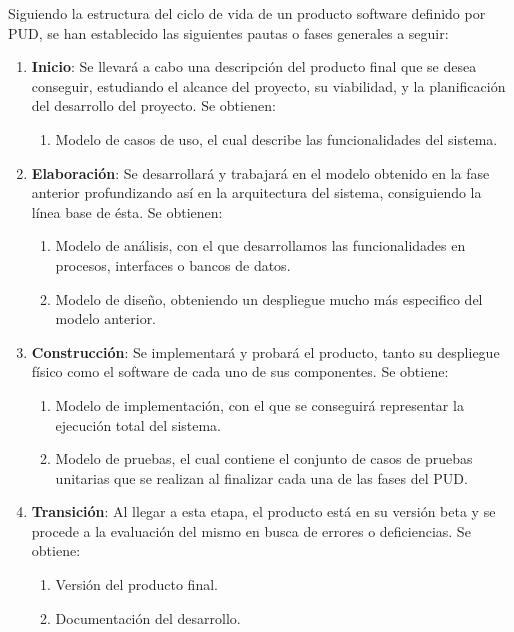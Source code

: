 Siguiendo la estructura del ciclo de vida de un producto software definido por PUD, se han establecido las siguientes pautas o fases generales a seguir:

\begin{enumerate}
    \item \textbf{Inicio}: Se llevará a cabo una descripción del producto final que se desea conseguir, estudiando el alcance del proyecto, su viabilidad, y la planificación del desarrollo del proyecto. Se obtienen:
    \begin{enumerate}
        \item Modelo de casos de uso, el cual describe las funcionalidades del sistema.
    \end{enumerate}
    \item \textbf{Elaboración}: Se desarrollará y trabajará en el modelo obtenido en la fase anterior profundizando así en la arquitectura del sistema, consiguiendo la línea base de ésta. Se obtienen:
    \begin{enumerate}
        \item Modelo de análisis, con el que desarrollamos las funcionalidades en procesos, interfaces o bancos de datos.
        \item Modelo de diseño, obteniendo un despliegue mucho más especifico del modelo anterior.
    \end{enumerate}
    \item \textbf{Construcción}: Se implementará y probará el producto, tanto su despliegue físico como el software de cada uno de sus componentes. Se obtiene:
    \begin{enumerate}
        \item Modelo de implementación, con el que se conseguirá representar la ejecución total del sistema.
        \item Modelo de pruebas, el cual contiene el conjunto de casos de pruebas unitarias que se realizan al finalizar cada una de las fases del PUD.
    \end{enumerate}
    \item \textbf{Transición}: Al llegar a esta etapa, el producto está en su versión beta y se procede a la evaluación del mismo en busca de errores o deficiencias. Se obtiene:
    \begin{enumerate}
        \item Versión del producto final.
        \item Documentación del desarrollo.
    \end{enumerate}
\end{enumerate}

